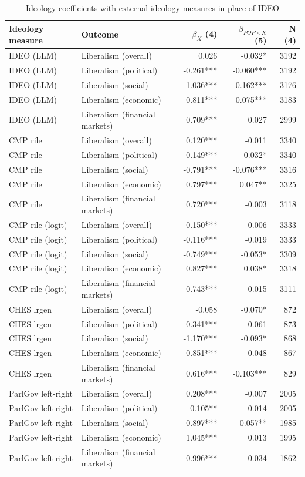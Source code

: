 \begin{table}[ht]
\centering
\caption{Ideology coefficients with external ideology measures in place of IDEO}
\label{tab:ideo_external}
\scriptsize
\begin{tabular}{llrrr}
\toprule
Ideology measure & Outcome & $\beta_{X}$ (4) & $\beta_{POP\times X}$ (5) & N (4) \\
\midrule
IDEO (LLM) & Liberalism (overall) & 0.026 & -0.032* & 3192 \\
IDEO (LLM) & Liberalism (political) & -0.261*** & -0.060*** & 3192 \\
IDEO (LLM) & Liberalism (social) & -1.036*** & -0.162*** & 3176 \\
IDEO (LLM) & Liberalism (economic) & 0.811*** & 0.075*** & 3183 \\
IDEO (LLM) & Liberalism (financial markets) & 0.709*** & 0.027 & 2999 \\
CMP rile & Liberalism (overall) & 0.120*** & -0.011 & 3340 \\
CMP rile & Liberalism (political) & -0.149*** & -0.032* & 3340 \\
CMP rile & Liberalism (social) & -0.791*** & -0.076*** & 3316 \\
CMP rile & Liberalism (economic) & 0.797*** & 0.047** & 3325 \\
CMP rile & Liberalism (financial markets) & 0.720*** & -0.003 & 3118 \\
CMP rile (logit) & Liberalism (overall) & 0.150*** & -0.006 & 3333 \\
CMP rile (logit) & Liberalism (political) & -0.116*** & -0.019 & 3333 \\
CMP rile (logit) & Liberalism (social) & -0.749*** & -0.053* & 3309 \\
CMP rile (logit) & Liberalism (economic) & 0.827*** & 0.038* & 3318 \\
CMP rile (logit) & Liberalism (financial markets) & 0.743*** & -0.015 & 3111 \\
CHES lrgen & Liberalism (overall) & -0.058 & -0.070* & 872 \\
CHES lrgen & Liberalism (political) & -0.341*** & -0.061 & 873 \\
CHES lrgen & Liberalism (social) & -1.170*** & -0.093* & 868 \\
CHES lrgen & Liberalism (economic) & 0.851*** & -0.048 & 867 \\
CHES lrgen & Liberalism (financial markets) & 0.616*** & -0.103*** & 829 \\
ParlGov left-right & Liberalism (overall) & 0.208*** & -0.007 & 2005 \\
ParlGov left-right & Liberalism (political) & -0.105** & 0.014 & 2005 \\
ParlGov left-right & Liberalism (social) & -0.897*** & -0.057** & 1985 \\
ParlGov left-right & Liberalism (economic) & 1.045*** & 0.013 & 1995 \\
ParlGov left-right & Liberalism (financial markets) & 0.996*** & -0.034 & 1862 \\
\bottomrule
\end{tabular}
\end{table}
